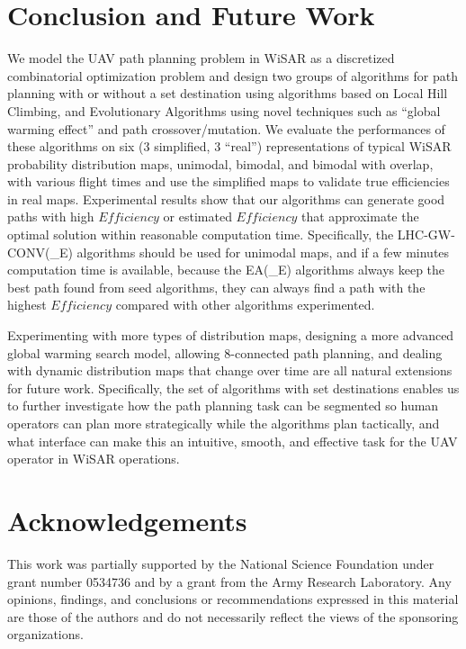 \documentclass[letterpaper, 10 pt, conference]{ieeeconf}
\begin{document}
\section{Conclusion and Future Work}

We model the UAV path planning problem in WiSAR as a discretized combinatorial optimization problem and design two groups of algorithms for path planning with or without a set destination using algorithms based on Local Hill Climbing, and Evolutionary Algorithms using novel techniques such as ``global warming effect'' and path crossover/mutation. We evaluate the performances of these algorithms on six (3 simplified, 3 ``real'') representations of typical WiSAR probability distribution maps, unimodal, bimodal, and bimodal with overlap, with various flight times and use the simplified maps to validate true efficiencies in real maps. Experimental results show that our algorithms can generate good paths with high $\mathit{Efficiency}$ or estimated $\mathit{Efficiency}$ that approximate the optimal solution within reasonable computation time. Specifically, the LHC-GW-CONV(\_E) algorithms should be used for unimodal maps, and if a few minutes computation time is available, because the EA(\_E) algorithms always keep the best path found from seed algorithms, they can always find a path with the highest $\mathit{Efficiency}$ compared with other algorithms experimented.

Experimenting with more types of distribution maps, designing a more advanced global warming search model, allowing 8-connected path planning, and dealing with dynamic distribution maps that change over time are all natural extensions for future work. Specifically, the set of algorithms with set destinations enables us to further investigate how the path planning task can be segmented so human operators can plan more strategically while the algorithms plan tactically, and what interface can make this an intuitive, smooth, and effective task for the UAV operator in WiSAR operations.

\section{Acknowledgements}
This work was partially supported by the National Science Foundation under grant number 0534736 and by a grant from the Army Research Laboratory.  Any opinions, findings, and conclusions or recommendations expressed in this material are those of the authors and do not necessarily reflect the views of the sponsoring organizations.


%

\end{document}
